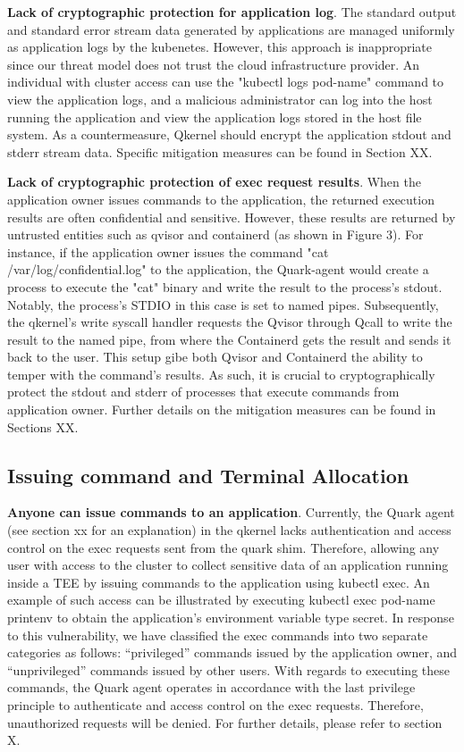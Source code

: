 \textbf{Lack of cryptographic protection for application log}. The standard output and standard error stream data generated by applications are managed uniformly as application logs by the kubenetes. However, this approach is inappropriate since our 
threat model does not trust the cloud infrastructure provider. An individual with cluster access can use the "kubectl logs pod-name" command to view the application logs, and a malicious administrator can log into the host running the application 
and view the application logs stored in the host file system. As a countermeasure, Qkernel should encrypt the application stdout and stderr stream data. Specific mitigation measures can be found in Section XX.

\textbf{Lack of cryptographic protection of exec request results}. When the application owner issues commands to the application, the returned execution results are often confidential and sensitive. However, these results are returned by untrusted entities 
such as qvisor and containerd (as shown in Figure 3). For instance, if the application owner issues the command "cat /var/log/confidential.log" to the application, the Quark-agent would create a process to execute the "cat" binary and write the 
result to the process's stdout. Notably, the process’s STDIO in this case is set to named pipes. Subsequently, the qkernel's write syscall handler requests the Qvisor through Qcall to write the result to the named pipe, from where the Containerd 
gets the result and sends it back to the user. This setup gibe both Qvisor and Containerd the ability to temper with the command's results. As such, it is crucial to cryptographically protect the stdout and stderr of processes that execute commands 
from application owner. Further details on the mitigation measures can be found in Sections XX.


\subsection{Issuing command and Terminal Allocation}
\textbf{Anyone can issue commands to an application}. Currently, the Quark agent (see section xx for an explanation) in the qkernel lacks authentication and access control on the exec requests sent from the quark shim.  Therefore,  allowing any 
user with access to the cluster to collect sensitive data of an application running inside a TEE by issuing commands to the application using kubectl exec.  An example of such access can be illustrated by executing kubectl exec pod-name printenv 
to obtain the application’s environment variable type secret. In response to this vulnerability, we have classified the exec commands into two separate categories as follows: “privileged” commands issued by the application owner, and “unprivileged” 
commands issued by other users. With regards to executing these commands, the Quark agent operates in accordance with the last privilege principle to authenticate and access control on the exec requests. Therefore, unauthorized requests will be 
denied. For further details, please refer to section X.

